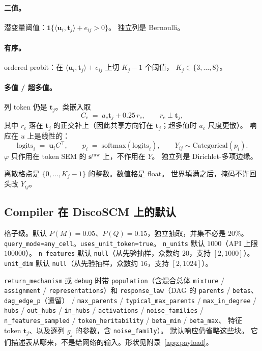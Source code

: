 \documentclass[11pt,a4paper,fontset=none]{ctexart}
\newcommand{\uu}{\mathbf{u}}
\begin{document}
\paragraph{二值。}
潜变量阈值：$\mathbf{1}\{\langle \uu_i,\mathbf{t}_j\rangle+e_{ij}>0\}$。
独立列是 Bernoulli。

\paragraph{有序。}
ordered probit：在 $\langle \uu_i,\mathbf{t}_j\rangle+e_{ij}$ 上切 $K_j-1$ 个阈值，
$K_j\in\{3,\ldots,8\}$。

\paragraph{多值 / 超多值。}
列 token 仍是 $\mathbf{t}_j$。类嵌入取
\begin{equation}
  C_c \;=\; a_c\mathbf{t}_j + 0.25\, r_c,\qquad r_c \perp \mathbf{t}_j,
\end{equation}
其中 $r_c$ 落在 $\mathbf{t}_j$ 的正交补上（因此共享方向钉在 $\mathbf{t}_j$；超多值时 $a_c$ 尺度更散）。
响应在 $u$ 上是线性的：
\begin{equation}
  \mathrm{logits}_i \;=\; \uu_i C^\top,\qquad
  p_i \;=\; \mathrm{softmax}(\mathrm{logits}_i),\qquad
  Y_{ij}\sim\mathrm{Categorical}(p_i).
\end{equation}
$\varphi$ 只作用在 token SEM 的 $\mathbf{s}^{\mathrm{raw}}$ 上，不作用在 $Y$。
独立列是 Dirichlet-多项边缘。

离散格点是 $\{0,\ldots,K_j-1\}$ 的整数。数值格是 float。
世界填满之后，掩码不许回头改 $Y_{ij}$。

\subsection{Compiler 在 DiscoSCM 上的默认}

格子级。默认 $P(M)=0.05$、$P(Q)=0.15$，独立抽取，并集不必是 $20\%$。
\texttt{query\_mode=any\_cell}。\texttt{uses\_unit\_token=true}。
\texttt{n\_units} 默认 $1000$（API 上限 $100000$）。
\texttt{n\_features} 默认 \texttt{null}（从先验抽样，众数约 $20$，支持 $[2,1000]$）。
\texttt{unit\_dim} 默认 \texttt{null}（从先验抽样，众数约 $16$，支持 $[2,1024]$）。

\texttt{return\_mechanism} 或 \texttt{debug} 时带
\texttt{population}（含混合总体 \texttt{mixture} / \texttt{assignment} / \texttt{representations}）和
\texttt{response\_law}（DAG 的 \texttt{parents} / \texttt{betas}、
\texttt{dag\_edge\_p}（遗留） / \texttt{max\_parents} /
\texttt{typical\_max\_parents} / \texttt{max\_in\_degree} /
\texttt{hubs} / \texttt{out\_hubs} / \texttt{in\_hubs} / \texttt{activations} / \texttt{noise\_families} /
\texttt{n\_features\_sampled} / \texttt{token\_heritability} /
\texttt{beta\_min} / \texttt{beta\_max}、
特征 token $\mathbf{t}_j$、以及逐列 $g_j$ 的参数，含 \texttt{noise\_family}）。
默认响应仍省略这些块。
它们描述表从哪来，不是给网络的输入。形状见附录~\ref{app:payload}。
\end{document}
